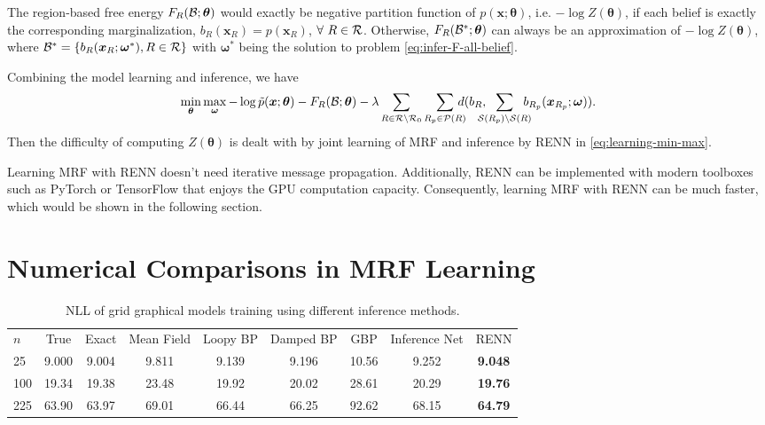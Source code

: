 The region-based free energy $F_R(\mathcal{B};\bm{\theta})$ would exactly be negative partition function of $p(\bm{x};\bm{\theta})$, i.e. $-\log{Z(\bm{\theta})}$, if each belief is exactly the corresponding marginalization, $b_R(\bm{x}_R)=p(\bm{x}_{R})$, $\forall~R\in \mathcal{R}$. Otherwise, $F_R(\mathcal{B}^{\ast};\bm{\theta})$ can always be an approximation of $-\log{Z(\bm{\theta})}$, where $\mathcal{B}^{\ast}= \{b_R(\bm{x}_R; \bm{\omega}^{\ast}), R\in \mathcal{R}\}$ with $\bm{\omega}^{\ast}$ being the solution to problem \eqref{eq:infer-F-all-belief}.

Combining the model learning and inference, we have
\begin{align}\label{eq:learning-min-max}
  \min_{\bm{\theta}}\max_{\bm{\omega}} -\log{\tilde{p}(\bm{x}; \bm{\theta})} - F_R(\Bb; \bm{\theta}) 
  -\lambda \sum_{R\in \Rr \backslash \Rr_0} \sum_{R_p \in \Pp(R)}\!\!\!\!\!d( b_R, \!\!\!\!\! \sum_{\Ss(R_p)\backslash \Ss(R)}\!\!\!\!\! b_{R_p}(\bm{x}_{R_p}; \bm{\omega})).
\end{align}
Then the difficulty of computing $Z(\bm{\theta})$ is dealt with by joint learning of MRF and inference by RENN in \eqref{eq:learning-min-max}.

Learning MRF with RENN doesn't need iterative message propagation. Additionally, RENN can be implemented with modern toolboxes such as PyTorch or TensorFlow that enjoys the GPU computation capacity. Consequently, learning MRF with RENN can be much faster, which would be shown in the following section.


\section{Numerical Comparisons in MRF Learning}

\begin{table*}[t]
  \caption{NLL of grid graphical models training using different inference methods.}
  \label{tab:nll-training-grid-n5n10}
  \begin{center}
    \begin{small}
      \setlength\tabcolsep{2pt}
      \begin{tabular}{lcccccccc}
        \toprule
        $n$ & True & Exact & Mean Field & Loopy BP & Damped BP & GBP & Inference Net & RENN \\
        25  &  9.000  &  9.004  &  9.811  &  {9.139}  &  9.196  &  10.56  &  9.252  &  \textbf{9.048}  \\
        100 &  19.34  &  19.38  &  23.48  &  {19.92}  &  20.02  &  28.61  &  20.29  &  \textbf{19.76} \\
        225 &  63.90  &  63.97  &  69.01  &  66.44    &  66.25  &  92.62  &  68.15  &  \textbf{64.79}  \\
        \bottomrule
      \end{tabular}
      
    \end{small}
  \end{center}
\end{table*}


